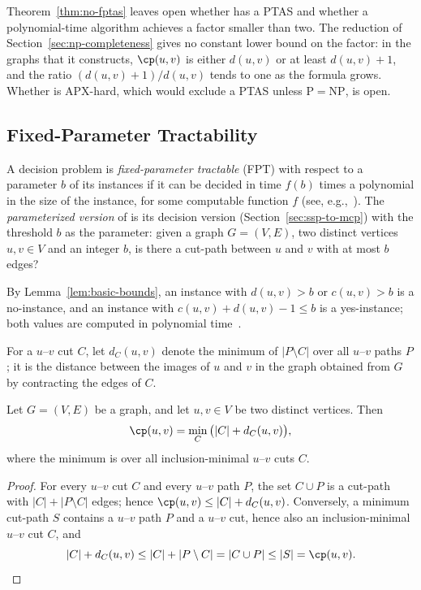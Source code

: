 Theorem~\ref{thm:no-fptas} leaves open whether \MinCutPath{} has a PTAS and whether a polynomial-time algorithm achieves a factor smaller than two.
The reduction of Section~\ref{sec:np-completeness} gives no constant lower bound on the factor: in the graphs that it constructs, $\cp(u,v)$ is either $d(u,v)$ or at least $d(u,v) + 1$, and the ratio $(d(u,v) + 1)/d(u,v)$ tends to one as the formula grows.
Whether \MinCutPath{} is APX-hard, which would exclude a PTAS unless $\mathrm{P} = \mathrm{NP}$, is open.

\subsection{Fixed-Parameter Tractability}
\label{sec:fpt}

A decision problem is \emph{fixed-parameter tractable} (FPT) with respect to a parameter $b$ of its instances if it can be decided in time $f(b)$ times a polynomial in the size of the instance, for some computable function $f$ (see, e.g.,~\cite{Marx2013Separators}).
The \emph{parameterized version} of \MinCutPath{} is its decision version (Section~\ref{sec:ssp-to-mcp}) with the threshold $b$ as the parameter: given a graph $G = (V, E)$, two distinct vertices $u, v \in V$ and an integer $b$, is there a cut-path between $u$ and $v$ with at most $b$ edges?

By Lemma~\ref{lem:basic-bounds}, an instance with $d(u,v) > b$ or $c(u,v) > b$ is a no-instance, and an instance with $c(u,v) + d(u,v) - 1 \leq b$ is a yes-instance; both values are computed in polynomial time~\cite{Cormen2022}.

For a $u$--$v$ cut $C$, let $d_C(u,v)$ denote the minimum of $|P \setminus C|$ over all $u$--$v$ paths $P$; it is the distance between the images of $u$ and $v$ in the graph obtained from $G$ by contracting the edges of $C$.

\begin{lemma}
\label{lem:contraction}
Let $G = (V, E)$ be a graph, and let $u, v \in V$ be two distinct vertices. Then
\[
\cp(u,v) = \min_{C}\, \bigl(|C| + d_C(u,v)\bigr),
\]
where the minimum is over all inclusion-minimal $u$--$v$ cuts $C$.
\end{lemma}

\begin{proof}
For every $u$--$v$ cut $C$ and every $u$--$v$ path $P$, the set $C \cup P$ is a cut-path with $|C| + |P \setminus C|$ edges; hence $\cp(u,v) \leq |C| + d_C(u,v)$.
Conversely, a minimum cut-path $S$ contains a $u$--$v$ path $P$ and a $u$--$v$ cut, hence also an inclusion-minimal $u$--$v$ cut $C$, and
\[
|C| + d_C(u,v) \leq |C| + |P \setminus C| = |C \cup P| \leq |S| = \cp(u,v). \qedhere
\]
\end{proof}

